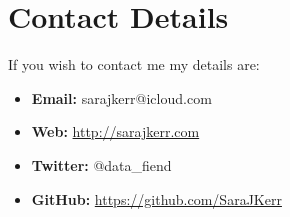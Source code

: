 \documentclass[12pt]{article}
\begin{document}
 \newpage
 
 \section{Contact Details}
 If you wish to contact me my details are:
 \begin{itemize}
 \item \textbf{Email:} sarajkerr@icloud.com
 \item \textbf{Web:} \url{http://sarajkerr.com}
 \item \textbf{Twitter:} @data{\_}fiend
 \item \textbf{GitHub:} \url{https://github.com/SaraJKerr}
 \end{itemize}
\end{document}
